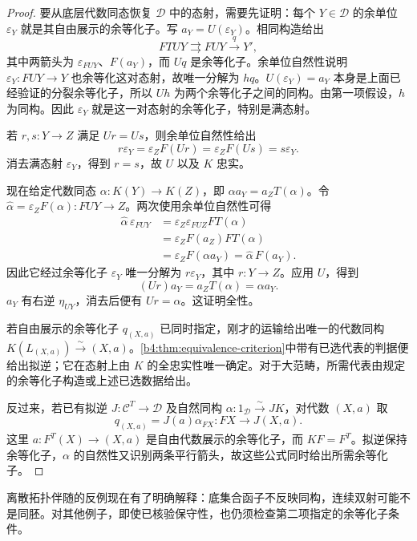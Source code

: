 \begin{proof}
	要从底层代数同态恢复 \(\mathcal D\) 中的态射，需要先证明：每个 \(Y\in\mathcal D\) 的余单位 \(\varepsilon_Y\) 就是其自由展示的余等化子。写 \(a_Y=U(\varepsilon_Y)\)。相同构造给出
	\[
		FTUY\rightrightarrows FUY\xrightarrow{q}Y',
	\]
	其中两箭头为 \(\varepsilon_{FUY}\)、\(F(a_Y)\)，而 \(Uq\) 是余等化子。余单位自然性说明 \(\varepsilon_Y:FUY\to Y\) 也余等化这对态射，故唯一分解为 \(hq\)。\(U(\varepsilon_Y)=a_Y\) 本身是上面已经验证的分裂余等化子，所以 \(Uh\) 为两个余等化子之间的同构。由第一项假设，\(h\) 为同构。因此 \(\varepsilon_Y\) 就是这一对态射的余等化子，特别是满态射。

	若 \(r,s:Y\to Z\) 满足 \(Ur=Us\)，则余单位自然性给出
	\[
		r\varepsilon_Y=\varepsilon_ZF(Ur) =\varepsilon_ZF(Us)=s\varepsilon_Y.
	\]
	消去满态射 \(\varepsilon_Y\)，得到 \(r=s\)，故 \(U\) 以及 \(K\) 忠实。

	现在给定代数同态 \(\alpha:K(Y)\to K(Z)\)，即 \(\alpha a_Y=a_ZT(\alpha)\)。令 \(\widehat\alpha=\varepsilon_ZF(\alpha):FUY\to Z\)。两次使用余单位自然性可得
	\[
		\begin{aligned}
			\widehat\alpha\,\varepsilon_{FUY} &=\varepsilon_Z\varepsilon_{FUZ}FT(\alpha)\\
			&=\varepsilon_ZF(a_Z)FT(\alpha)\\
			&=\varepsilon_ZF(\alpha a_Y) =\widehat\alpha\,F(a_Y).
		\end{aligned}
	\]
	因此它经过余等化子 \(\varepsilon_Y\) 唯一分解为 \(r\varepsilon_Y\)，其中 \(r:Y\to Z\)。应用 \(U\)，得到
	\[
		(Ur)a_Y=a_ZT(\alpha)=\alpha a_Y.
	\]
	\(a_Y\) 有右逆 \(\eta_{UY}\)，消去后便有 \(Ur=\alpha\)。这证明全性。

	若自由展示的余等化子 \(q_{(X,a)}\) 已同时指定，刚才的运输给出唯一的代数同构 \(K(L_{(X,a)})\xrightarrow{\sim}(X,a)\)。\cref{b4:thm:equivalence-criterion}中带有已选代表的判据便给出拟逆；它在态射上由 \(K\) 的全忠实性唯一确定。对于大范畴，所需代表由规定的余等化子构造或上述已选数据给出。

	反过来，若已有拟逆 \(J:\mathcal C^T\to\mathcal D\) 及自然同构 \(\alpha:1_{\mathcal D}\xrightarrow{\sim}JK\)，对代数 \((X,a)\) 取
	\[
		q_{(X,a)}=J(a)\alpha_{FX}:FX\longrightarrow J(X,a).
	\]
	这里 \(a:F^T(X)\to(X,a)\) 是自由代数展示的余等化子，而 \(KF=F^T\)。拟逆保持余等化子，\(\alpha\) 的自然性又识别两条平行箭头，故这些公式同时给出所需余等化子。
\end{proof}

离散拓扑伴随的反例现在有了明确解释：底集合函子不反映同构，连续双射可能不是同胚。对其他例子，即使已核验保守性，也仍须检查第二项指定的余等化子条件。

